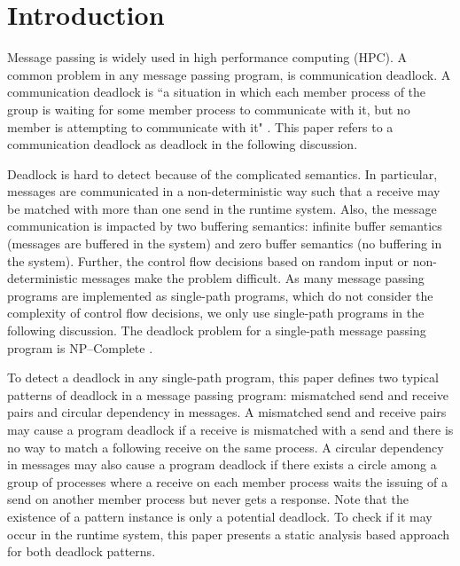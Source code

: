 \section{Introduction}
Message passing is widely used in high performance computing (HPC). A common problem in any message passing program, is communication deadlock. A communication deadlock is ``a situation in which each member process of the group is waiting for some member process to communicate with it, but no member is attempting to communicate with it" \cite{DBLP:conf/fsttcs/Natarajan84}. This paper refers to a communication deadlock as deadlock in the following discussion. 

Deadlock is hard to detect because of the complicated semantics. In particular, messages are communicated in a non-deterministic way such that a receive may be matched with more than one send in the runtime system. Also, the message communication is impacted by two buffering semantics: infinite buffer semantics (messages are buffered in the system) and zero buffer semantics (no buffering in the system). Further, the control flow decisions based on random input or non-deterministic messages make the problem difficult. As many message passing programs are implemented as single-path programs, which do not consider the complexity of control flow decisions, we only use single-path programs in the following discussion. The deadlock problem for a single-path message passing program is NP--Complete \cite{DBLP:conf/fm/ForejtKNS14}.

To detect a deadlock in any single-path program, this paper defines two typical patterns of deadlock in a message passing program: mismatched send and receive pairs and circular dependency in messages. A mismatched send and receive pairs may cause a program deadlock if a receive is mismatched with a send and there is no way to match a following receive on the same process. A circular dependency in messages may also cause a program deadlock if there exists a circle among a group of processes where a receive on each member process waits the issuing of a send on another member process but never gets a response. Note that the existence of a pattern instance is only a potential deadlock. To check if it may occur in the runtime system, this paper presents a static analysis based approach for both deadlock patterns.   

